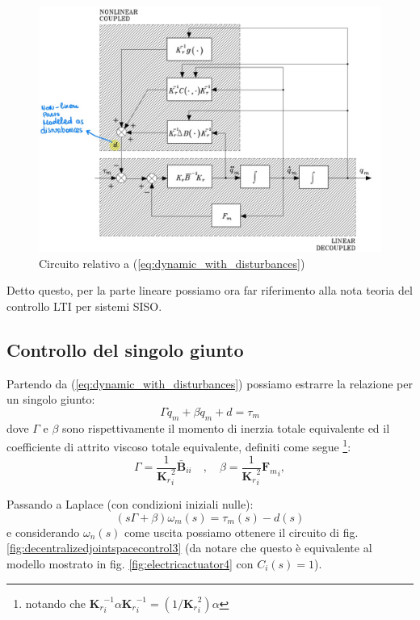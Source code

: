 \begin{figure}[t]
	\centering
	\includegraphics[width=0.7\linewidth]{images/decentralized_joint_space_control_2}
	\caption{Circuito relativo a (\ref{eq:dynamic_with_disturbances})}
	\label{fig:decentralizedjointspacecontrol2}
\end{figure}

Detto questo, per la parte lineare possiamo ora far riferimento alla nota teoria del controllo LTI per sistemi SISO.



\subsection{Controllo del singolo giunto}

Partendo da (\ref{eq:dynamic_with_disturbances}) possiamo estrarre la relazione per un singolo giunto:
\begin{equation}\label{eq:single_joint_dynamic}
\Gamma \ddot{q}_m + \beta \dot{q}_m + d = \tau_m
\end{equation}
dove $\Gamma$ e $\beta$ sono rispettivamente il momento di inerzia totale equivalente ed il coefficiente di attrito viscoso totale equivalente, definiti come segue 
\footnote{notando che ${\mathbf{K}_r}_i^{-1} \alpha {\mathbf{K}_r}_i^{-1} = (1/{\mathbf{K}_r}_i^2) \alpha $}:
$$
\Gamma = \frac{1}{{\mathbf{K}_r}_i^2} \mathbf{\bar{B}}_{ii} 
\quad , \quad
\beta = \frac{1}{{\mathbf{K}_r}_i^2} {\mathbf{F}_m}_i, 
$$

Passando a Laplace (con condizioni iniziali nulle):
\begin{equation}\label{eq:single_joint_dynamic_laplace}
(s\Gamma + \beta) \omega_m(s) = \tau_m(s) - d(s)
\end{equation}
e considerando $\omega_n(s)$ come uscita possiamo ottenere il circuito di fig. \ref{fig:decentralizedjointspacecontrol3} (da notare che questo è equivalente al modello mostrato in fig. \ref{fig:electricactuator4} con $C_i(s) = 1$).


